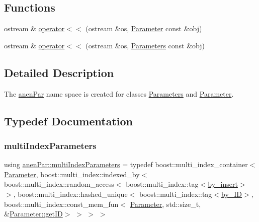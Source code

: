 \subsection*{Functions}
\begin{DoxyCompactItemize}
\item 
ostream \& \mbox{\hyperlink{namespaceanen_par_a52a5a22e980d0d41a493b6cb3f5b0bb4}{operator$<$$<$}} (ostream \&os, \mbox{\hyperlink{classanen_par_1_1_parameter}{Parameter}} const \&obj)
\item 
ostream \& \mbox{\hyperlink{namespaceanen_par_a670cbfb557a503e08dd170516c81b075}{operator$<$$<$}} (ostream \&os, \mbox{\hyperlink{classanen_par_1_1_parameters}{Parameters}} const \&obj)
\end{DoxyCompactItemize}


\subsection{Detailed Description}
The \mbox{\hyperlink{namespaceanen_par}{anen\+Par}} name space is created for classes \mbox{\hyperlink{classanen_par_1_1_parameters}{Parameters}} and \mbox{\hyperlink{classanen_par_1_1_parameter}{Parameter}}. 

\subsection{Typedef Documentation}
\mbox{\label{namespaceanen_par_a80347e56535f3553dead0c9515dbecd6}} 
\subsubsection{\texorpdfstring{multi\+Index\+Parameters}{multiIndexParameters}}
{\footnotesize\ttfamily using \mbox{\hyperlink{namespaceanen_par_a80347e56535f3553dead0c9515dbecd6}{anen\+Par\+::multi\+Index\+Parameters}} = typedef boost\+::multi\+\_\+index\+\_\+container$<$ \mbox{\hyperlink{classanen_par_1_1_parameter}{Parameter}}, boost\+::multi\+\_\+index\+::indexed\+\_\+by$<$ boost\+::multi\+\_\+index\+::random\+\_\+access$<$ boost\+::multi\+\_\+index\+::tag$<$\mbox{\hyperlink{structanen_par_1_1by__insert}{by\+\_\+insert}}$>$ $>$, boost\+::multi\+\_\+index\+::hashed\+\_\+unique$<$ boost\+::multi\+\_\+index\+::tag$<$\mbox{\hyperlink{structanen_par_1_1by___i_d}{by\+\_\+\+ID}}$>$, boost\+::multi\+\_\+index\+::const\+\_\+mem\+\_\+fun$<$ \mbox{\hyperlink{classanen_par_1_1_parameter}{Parameter}}, std\+::size\+\_\+t, \&\mbox{\hyperlink{classanen_par_1_1_parameter_a12c2b322265422eea431043dd50f047d}{Parameter\+::get\+ID}}$>$ $>$ $>$ $>$}

